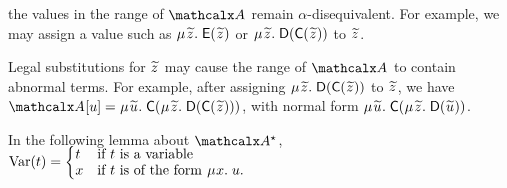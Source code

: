 \begin{examplex}
the values in the range of $\Val$ remain $\alpha$-disequivalent.
For example, we may assign a value such as
$\MU {\Varec{z}}.\; \const{E}( {\Varec{z}} )$ or
$\MU {\Varec{z}}.\; \const{D}( \const{C}( {\Varec{z}} ) )$
to ${\Varec{z}}$.
\begin{rep}Legal substitutions for ${\Varec{z}}$ may cause the range of $\Val$ to contain abnormal terms.
For example, after assigning $\MU {\Varec{z}}.\; \const{D}( \const{C}( {\Varec{z}} ) )$ to $\Varec{z}$, we have
$\Val \ec{u} = \MU {\Varec{u}}.\; \const{C}( \MU {\Varec{z}}.\; \const{D}( \const{C}( {\Varec{z}} ) ) )$,
with normal form
$\MU {\Varec{u}}.\; \const{C}( \MU {\Varec{z}}.\; \const{D}( {\Varec{u}} ) )$.\end{rep}
\xend
\end{examplex}

In the following lemma about $\ValC$,
$\vphantom{\Bigl(_j}\muvar( t ) = \smash{\begin{cases}
  t & \text{if $t$ is a variable} \\[-\jot]
  x & \text{if $t$ is of the form $\MU {x}.\; u$.} 
\end{cases}}$

%

